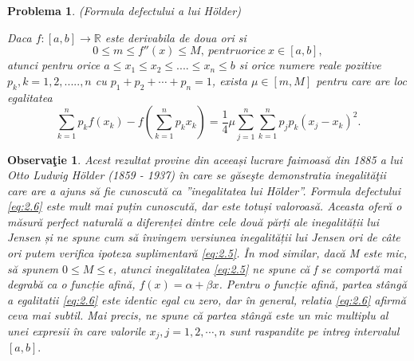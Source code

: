\documentclass[a4paper,12pt,oneside]{report}
\newtheorem{problem}{Problema}
\newtheorem{remark}{Observa\c{t}ie}
\begin{document}
\begin{problem}
(Formula defectului a lui Hölder)

Daca \(f : \left [ a,b  \right ] \to \mathbb{R}\) este derivabila de doua ori si
\begin{displaymath}
  0 \leq m \leq  f''\left ( x \right ) \leq  M,~ pentru orice ~x\in \left [ a,b \right ], \label{eq:2.5} \tag{2.5}
\end{displaymath}
atunci pentru orice  \(a\leq x_{1}\leq x_{2}\leq ....\leq x_{n} \leq b \) si orice numere reale pozitive \(p_{k}, k= 1,2,.....,n \) cu \(p_{1} + p_{2} + \cdots+ p_{n} = 1\),  exista  \(\mu \in \left [ m, M \right ]\) pentru care are loc egalitatea
\begin{displaymath}
  \sum_{k = 1}^{n}p_{k}f\left ( x_{k} \right ) - f\left ( \sum_{k = 1}^{n} p_{k}x_{k}\right ) = \frac{1}{4}\mu \sum_{j = 1}^{n}\sum_{k = 1}^{n}p_{j}p_{k}\left ( x_{j} - x_{k} \right )^{2}. \label{eq:2.6} \tag{2.6}
\end{displaymath}
\end{problem}
\begin{remark}
Acest rezultat provine din aceeași lucrare faimoasă din 1885 a lui Otto Ludwig Hölder (1859 - 1937) în care se găseşte demonstratia inegalităţii care are a ajuns să fie cunoscută  ca ”inegalitatea lui Hölder”. Formula defectului \ref{eq:2.6} este mult mai puțin cunoscută, dar este totuși valoroasă. Aceasta oferă o măsură perfect naturală a diferenței dintre cele două părți ale inegalității lui Jensen și ne spune cum să învingem versiunea  inegalității lui Jensen ori de câte ori putem verifica ipoteza suplimentară \ref{eq:2.5}.
În mod similar, dacă M este mic, să spunem \(0 \leq M \leq \epsilon\), atunci inegalitatea \ref{eq:2.5} ne spune că f se comportă mai degrabă ca o funcție afină, \(f\left ( x \right ) = \alpha  + \beta x\). Pentru o funcție afină, partea stângă a egalitatii \ref{eq:2.6} este identic egal cu zero, dar în general, relatia \ref{eq:2.6} afirmă ceva mai subtil. Mai precis, ne spune că partea stângă este un mic multiplu al unei expresii  în care valorile \(x_{j}, j = 1,2,\cdots ,n \) sunt raspandite pe intreg intervalul \(\left [ a, b \right ]. \)
\end{remark}
\end{document}
